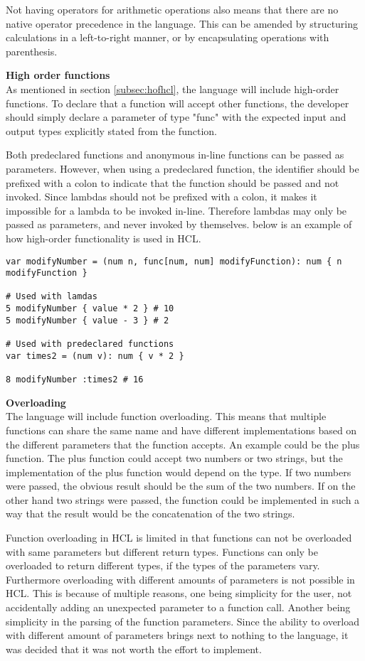 Not having operators for arithmetic operations also means that there are no native operator precedence in the language.
This can be amended by structuring calculations in a left-to-right manner, or by encapsulating operations with parenthesis. 

\textbf{High order functions}\\
As mentioned in section \ref{subsec:hofhcl}, the language will include high-order functions. 
To declare that a function will accept other functions, the developer should simply declare a parameter of type "func" with the expected input and output types explicitly stated from the function.

Both predeclared functions and anonymous in-line functions can be passed as parameters. 
However, when using a predeclared function, the identifier should be prefixed with a colon to indicate that the function should be passed and not invoked. 
Since lambdas should not be prefixed with a colon, it makes it impossible for a lambda to be invoked in-line. 
Therefore lambdas may only be passed as parameters, and never invoked by themselves.
below is an example of how high-order functionality is used in HCL.
\begin{lstlisting}
var modifyNumber = (num n, func[num, num] modifyFunction): num { n modifyFunction }

# Used with lamdas
5 modifyNumber { value * 2 } # 10
5 modifyNumber { value - 3 } # 2

# Used with predeclared functions
var times2 = (num v): num { v * 2 }

8 modifyNumber :times2 # 16

\end{lstlisting}

\textbf{Overloading}\\

The language will include function overloading. 
This means that multiple functions can share the same name and have different implementations based on the different parameters that the function accepts. 
An example could be the plus function. 
The plus function could accept two numbers or two strings, but the implementation of the plus function would depend on the type.
If two numbers were passed, the obvious result should be the sum of the two numbers.
If on the other hand two strings were passed, the function could be implemented in such a way that the result would be the concatenation of the two strings.

Function overloading in HCL is limited in that functions can not be overloaded with same parameters but different return types. 
Functions can only be overloaded to return different types, if the types of the parameters vary.
Furthermore overloading with different amounts of parameters is not possible in HCL.
This is because of multiple reasons, one being simplicity for the user, not accidentally adding an unexpected parameter to a function call. 
Another being simplicity in the parsing of the function parameters. 
Since the ability to overload with different amount of parameters brings next to nothing to the language, it was decided that it was not worth the effort to implement.

